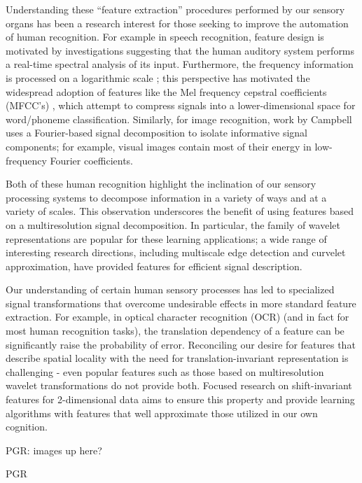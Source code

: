 \documentclass[12pt]{article}
\begin{document}
Understanding these ``feature extraction'' procedures performed by our sensory organs has been a research interest for those seeking to improve the automation of human recognition. For example in speech recognition, feature design is motivated by investigations suggesting that the human auditory system performs a real-time spectral analysis \cite{rabiner} of its input. Furthermore, the frequency information is processed on a logarithmic scale \cite{flanagan}; this perspective has motivated the widespread adoption of features like the Mel frequency cepstral coefficients (MFCC's) \cite{picone}, which attempt to compress signals into a lower-dimensional space for word/phoneme classification. Similarly, for image recognition, work by Campbell \cite{campbell-orientation,campbell-fourier} uses a Fourier-based signal decomposition to isolate informative signal components; for example, visual images contain most of their energy in low-frequency Fourier coefficients. 

Both of these human recognition highlight the inclination of our sensory processing systems to decompose information in a variety of ways and at a variety of scales. This observation underscores the benefit of using features based on a multiresolution signal decomposition. In particular, the family of wavelet representations \cite{mallat-wavtour} are popular for these learning applications; a wide range of interesting research directions, including multiscale edge detection and curvelet approximation, have provided features for efficient signal description. 

Our understanding of certain human sensory processes has led to specialized signal transformations that overcome undesirable effects in more standard feature extraction. For example, in optical character recognition (OCR) (and in fact for most human recognition tasks), the translation dependency of a feature can be significantly raise the probability of error. Reconciling our desire for features that describe spatial locality with the need for translation-invariant representation is challenging - even popular features such as those based on multiresolution wavelet transformations \cite{mallat-multires} do not provide both. Focused research on shift-invariant features for 2-dimensional data \cite{marco} aims to ensure this property and provide learning algorithms with features that well approximate those utilized in our own cognition.

PGR: images up here?

PGR
\end{document}
